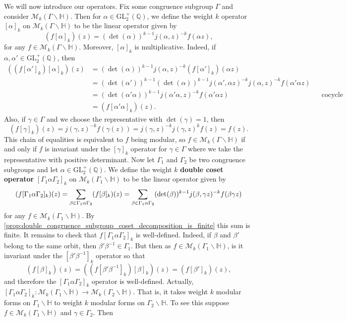 \documentclass[12pt]{book}
\theoremstyle{definition}\newframedtheorem{method}{Method}
\newcommand{\mc}{\mathcal}
\newcommand{\GL}{\mathrm{GL}}
\newcommand{\Q}{\mathbb{Q}}
\renewcommand{\H}{\mathbb{H}}
\renewcommand{\a}{\alpha}
\renewcommand{\b}{\beta}
\newcommand{\g}{\gamma}
\newcommand{\G}{\Gamma}
\newcommand{\<}{\langle}
\renewcommand{\>}{\rangle}
\newcommand{\GH}{\G\backslash\H}
\begin{document}
      We will now introduce our operators. Fix some congruence subgroup $\G$ and consider $\mc{M}_{k}(\GH)$. Then for $\a \in \GL_{2}^{+}(\Q)$, we define the weight $k$ operator $[\a]_{k}$ on $\mc{M}_{k}(\GH)$ to be the linear operator given by
      \[
        (f[\a]_{k})(z) = (\det(\a))^{k-1}j(\a,z)^{-k}f(\a z),
      \]
      for any $f \in \mc{M}_{k}(\GH)$. Moreover, $[\a]_{k}$ is multiplicative. Indeed, if $\a,\a' \in \GL_{2}^{+}(\Q)$, then
      \begin{align*}
        ((f[\a']_{k})[\a]_{k})(z) &= (\det(\a))^{k-1}j(\a,z)^{-k}(f[\a']_{k})(\a z) \\
        &= (\det(\a'))^{k-1}(\det(\a))^{k-1}j(\a',\a z)^{-k}j(\a,z)^{-k}f(\a'\a z) \\
        &= (\det(\a'\a))^{k-1}j(\a'\a,z)^{-k}f(\a'\a z) && \text{cocycle condition} \\
        &= (f[\a'\a]_{k})(z).
      \end{align*}
      Also, if $\g \in \G$ and we choose the representative with $\det(\g) = 1$, then
      \[
        (f[\g]_{k})(z) = j(\g,z)^{-k}f(\g(z)) = j(\g,z)^{-k}j(\g,z)^{k}f(z) = f(z).
      \]
      This chain of equalities is equivalent to $f$ being modular, so $f \in \mc{M}_{k}(\GH)$ if and only if $f$ is invariant under the $[\g]_{k}$ operator for $\g \in \G$ where we take the representative with positive determinant. Now let $\G_{1}$ and $\G_{2}$ be two congruence subgroups and let $\a \in \GL_{2}^{+}(\Q)$. We define the weight $k$ \textbf{double coset operator} $[\G_{1}\a\G_{2}]_{k}$ on $\mc{M}_{k}(\G_{1}\backslash\H)$ to be the linear operator given by
      \[
        (f[\G_{1}\a\G_{2}]_{k})(z) = \sum_{\b \in \G_{1}\a\G_{2}}(f[\b]_{k})(z) = \sum_{\b \in \G_{1}\a\G_{2}}(\det(\b))^{k-1}j(\b,\g z)^{-k}f(\b\g z) \\
      \]
      for any $f \in \mc{M}_{k}(\G_{1}\backslash\H)$. By \cref{prop:double_congruence_subgroup_coset_decomposition_is_finite} this sum is finite. It remains to check that $f[\G_{1}\a\G_{2}]_{k}$ is well-defined. Indeed, if $\b$ and $\b'$ belong to the same orbit, then $\b'\b^{-1} \in \G_{1}$. But then as $f \in \mc{M}_{k}(\G_{1}\backslash\H)$, is it invariant under the $[\b'\b^{-1}]_{k}$ operator so that
      \[
        (f[\b]_{k})(z) = ((f[\b'\b^{-1}]_{k})[\b]_{k})(z) = (f[\b']_{k})(z),
      \]
      and therefore the $[\G_{1}\a\G_{2}]_{k}$ operator is well-defined. Actually, $[\G_{1}\a\G_{2}]_{k}:\mc{M}_{k}(\G_{1}\backslash\H) \to \mc{M}_{k}(\G_{2}\backslash\H)$. That is, it takes weight $k$ modular forms on $\G_{1}\backslash\H$ to weight $k$ modular forms on $\G_{2}\backslash\H$. To see this suppose $f \in \mc{M}_{k}(\G_{1}\backslash\H)$ and $\g \in \G_{2}$. Then
\end{document}
